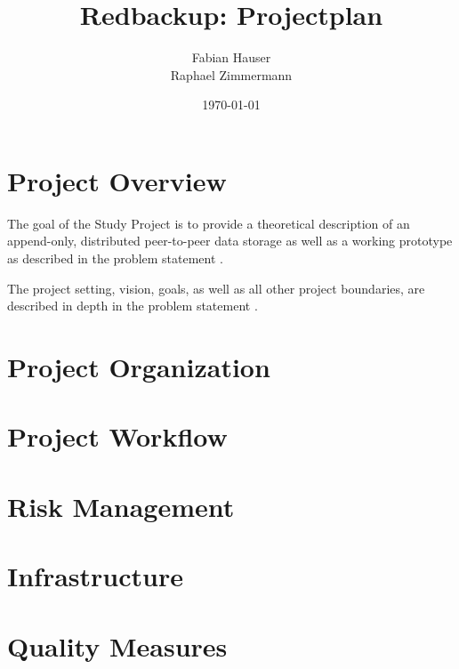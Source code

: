 \documentclass[a4paper]{article}
\title{Redbackup: Projectplan}
\author{
		Fabian Hauser \\
		Raphael Zimmermann
}
\date{\today}
\begin{document}
\maketitle

\section{Project Overview}
The goal of the Study Project is to provide a theoretical description of an append-only, distributed peer-to-peer data storage as well as a working prototype as described in the problem statement \cite{problemstatement}.

The project setting, vision, goals, as well as all other project boundaries, are described in depth in the problem statement \cite{problemstatement}.

\section{Project Organization}


\section{Project Workflow}


\section{Risk Management}

\section{Infrastructure}

\section{Quality Measures}



\end{document}
